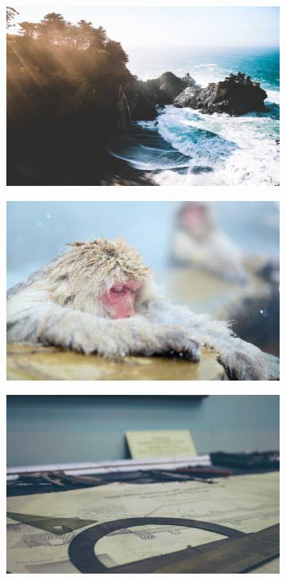 \documentclass{article}
\begin{document}
\begin{figure}
    \centering
    \begin{subfigure}[b]{0.7 \textwidth}
    \includegraphics[width=\textwidth]{Images/autoencoder/reconstructed/512_256_128/lr/test1_80.png}
    \end{subfigure}
    \begin{subfigure}[b]{0.7 \textwidth}
       \includegraphics[width=\textwidth]{Images/autoencoder/reconstructed/512_256_128/lr/test2_80.png}
    \end{subfigure}
    \begin{subfigure}[b]{0.7 \textwidth}
     \includegraphics[width=\textwidth]{Images/autoencoder/reconstructed/512_256_128/lr/test3_80.png}

\end{subfigure}
\end{figure}
\end{document}
